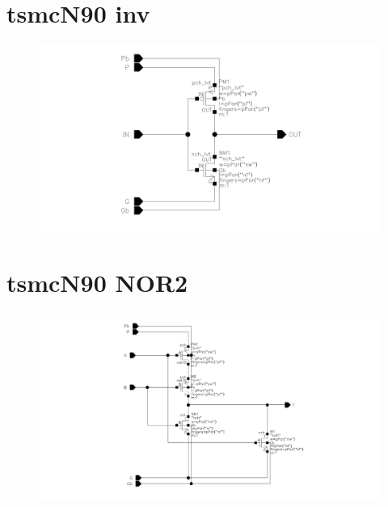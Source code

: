 \documentclass[english, 12pt, a4paper]{ifimaster}
\begin{document}
\begin{appendices}
\section{tsmcN90 inv}
\begin{figure}[!ht]
 \centering
 \includegraphics[width=20cm, angle=90]{img/tsmcN90rf_inv_lvt_schem}
\end{figure}

\newpage
\section{tsmcN90 NOR2}
\begin{figure}[!ht]
 \centering
 \includegraphics[width=20cm, angle=90]{img/tsmcN90_nor2_schem}
\end{figure}

\newpage

\end{appendices}
\end{document}
